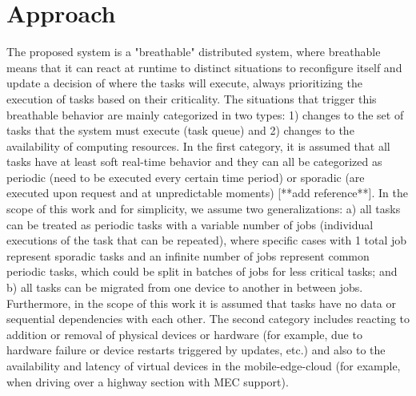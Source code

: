 
\chapter{Approach}\label{chap:approach}

The proposed system is a "breathable" distributed system, where breathable means that it can react at runtime to distinct situations to reconfigure itself and update a decision of where the tasks will execute, always prioritizing the execution of tasks based on their criticality. The situations that trigger this breathable behavior are mainly categorized in two types: 1) changes to the set of tasks that the system must execute (task queue) and 2) changes to the availability of computing resources. In the first category, it is assumed that all tasks have at least soft real-time behavior and they can all be categorized as periodic (need to be executed every certain time period) or sporadic (are executed upon request and at unpredictable moments) [**add reference**]. In the scope of this work and for simplicity, we assume two generalizations: a) all tasks can be treated as periodic tasks with a variable number of jobs (individual executions of the task that can be repeated), where specific cases with 1 total job represent sporadic tasks and an infinite number of jobs represent common periodic tasks, which could be split in batches of jobs for less critical tasks; and b) all tasks can be migrated from one device to another in between jobs. Furthermore, in the scope of this work it is assumed that tasks have no data or sequential dependencies with each other. The second category includes reacting to addition or removal of physical devices or hardware (for example, due to hardware failure or device restarts triggered by updates, etc.) and also to the availability and latency of virtual devices in the mobile-edge-cloud (for example, when driving over a highway section with MEC support).

